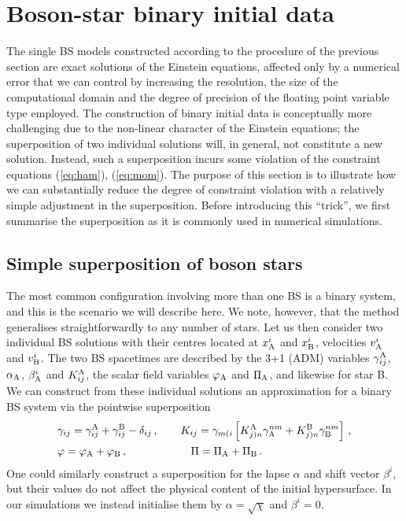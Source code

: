 \documentclass[]{iopart}
\begin{document}
\section{Boson-star binary initial data}
\label{sec:superposition}
%
The single BS models constructed according to the procedure of the
previous section are exact solutions of the Einstein equations,
affected only by a numerical error that we can control by increasing
the resolution, the size of the computational domain and the degree
of precision of the floating point variable type employed. The
construction of binary initial data is conceptually more challenging
due to the non-linear character of the Einstein equations; the
superposition of two individual solutions will, in general, not
constitute a new solution. Instead, such a superposition incurs
some violation of the constraint equations (\ref{eq:ham}),
(\ref{eq:mom}). The purpose of this section is to illustrate how
we can substantially reduce the degree of constraint violation with
a relatively simple adjustment in the superposition. Before introducing
this ``trick'', we first summarise the superposition as it is
commonly used in numerical simulations.

\subsection{Simple superposition of boson stars}
%
\label{sec:superpossimple}
The most common configuration involving more than one BS is a binary
system, and this is the scenario we will describe here. We note,
however, that the method generalises straightforwardly to any number
of stars.  Let us then consider two individual BS solutions with
their centres located at $x^i_{\rm A}$ and $x^i_{\rm B}$, velocities
$v_{\rm A}^i$ and $v_{\rm B}^i$.  The two BS spacetimes are described
by the 3+1 (ADM) variables $\gamma_{ij}^{\rm A}$, $\alpha_{\rm A}$,
$\beta_{\rm A}^i$ and $K_{ij}^{\rm A}$, the scalar field variables
$\varphi_{\rm A}$ and $\Pi_{\rm A}$, and likewise for star B. We
can construct from these individual solutions an approximation for
a binary BS system via the pointwise superposition
%
\begin{align}
  &\gamma_{ij} =
  \gamma_{ij}^{\rm A}
  +\gamma_{ij}^{\rm B}
  -\delta_{ij}\,,~~~~~~
  K_{ij} = \gamma_{m(i}
  \left[
  K^{\rm A}_{j)n}
  \gamma_{\rm A}^{nm}
  +K^{\rm B}_{j)n}
  \gamma_{\rm B}^{nm}
  \right]\,,
  \nonumber \\
  &\varphi = \varphi_{\rm A} + \varphi_{\rm B}\,,
  \hspace{0.85cm}~~~~~~~~~~
  \Pi = \Pi_{\rm A} + \Pi_{\rm B}\,.
  \label{eq:superpossimple}
\end{align}
%
One could similarly construct a superposition for the lapse $\alpha$
and shift vector $\beta^i$, but their values do not affect the
physical content of the initial hypersurface.  In our simulations
we instead initialise them by $\alpha=\sqrt{\chi}$ and $\beta^i=0$.
\end{document}
